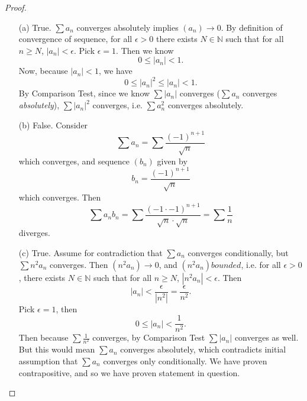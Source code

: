\documentclass[11pt,twoside, reqno]{amsart}
\theoremstyle{remark}
\def\N{\mathbb N}
\begin{document}
\begin{proof}
\begin{enumerate}
    \item [(a)] True. $\sum a_n$ converges absolutely implies $(a_n) \to 0$. By definition of convergence of sequence, for all $\epsilon > 0$ there exists $N \in \N$ such that for all $n \geq N$, $|a_n| < \epsilon$. Pick $\epsilon = 1$. Then we know 
    $$
        0 \leq |a_n| < 1.
    $$
    Now, because $|a_n| < 1$, we have
    $$
        0\leq |a_n|^2 \leq |a_n| < 1.
    $$
    By Comparison Test, since we know $\sum |a_n|$ converges ($\sum a_n$ converges \textit{absolutely}), $\sum |a_n|^2$ converges, i.e. $\sum a_n^2$ converges absolutely.
    \item [(b)] False. Consider
    $$
        \sum a_n = \sum \frac{(-1)^{n+1}}{\sqrt{n}}
    $$
    which converges, and sequence $(b_n)$ given by
    $$
        b_n = \frac{(-1)^{n+1}}{\sqrt{n}}
    $$
    which converges. Then 
    $$
        \sum a_n b_n = \sum \frac{(-1\cdot -1)^{n+1}}{\sqrt{n} \cdot \sqrt{n}} = \sum \frac{1}{n}
    $$
    diverges.
    \item [(c)] True. Assume for contradiction that $\sum a_n$ converges conditionally, but $\sum n^2 a_n$ converges. Then $(n^2 a_n) \to 0$, and $(n^2a_n) bounded$, i.e. for all $\epsilon > 0$, there exists $N \in \N$ such that for all $n \geq N$, $|n^2a_n| < \epsilon$. Then
    $$
        |a_n| < \frac{\epsilon}{|n^2|} = \frac{\epsilon}{n^2}.
    $$
    Pick $\epsilon = 1$, then
    $$
        0 \leq |a_n| < \frac{1}{n^2}.
    $$
    Then because $\sum \frac{1}{n^2}$ converges, by Comparison Test $\sum |a_n|$ converges as well. But this would mean $\sum a_n$ converges absolutely, which contradicts initial assumption that $\sum a_n$ converges only conditionally. We have proven contrapositive, and so we have proven statement in question.
\end{enumerate}

\end{proof}
\end{document}
